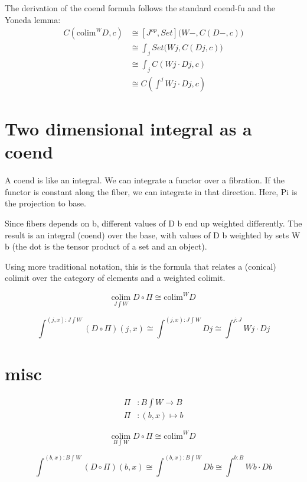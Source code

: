 \documentclass[11pt]{amsart}
\begin{document}
The derivation of the coend formula follows the standard coend-fu and the Yoneda lemma:
\begin{align*}
C(\mbox{colim}^W D, c) & \cong [J^{op}, Set]\big(W-, C(D -, c)\big) \\
 &\cong \int_j Set \big(W j, C(D j, c)\big) \\
 &\cong \int_j C(W j \cdot D j, c) \\
 &\cong C(\int^j W j \cdot D j, c)
\end{align*}

\section{Two dimensional integral as a coend}


A coend is like an integral. We can integrate a functor over a fibration. If the functor is constant along the fiber, we can integrate in that direction. Here, Pi is the projection to base.

Since fibers depends on b, different values of D b end up weighted differently. The result is an integral (coend) over the base, with values of D b weighted by sets W b (the dot is the tensor product of a set and an object).

Using more traditional notation, this is the formula that relates a (conical) colimit over the category of elements and a weighted colimit.

\[\underset{J \int W}{\mbox{colim}} \; D \circ \Pi  \cong \mbox{colim}^W D\]

\[\int^{(j, x) \colon J\int W} (D \circ \Pi) (j, x) \cong \int^{(j, x) \colon J\int W} D j  \cong   \int^{j \colon J} W j \cdot D j\]

\section{misc}

\begin{align*}
\Pi &\colon B \int W  \to B \\
\Pi &\colon (b, x) \mapsto b
\end{align*}

\[\underset{B \int W}{\mbox{colim}} \; D \circ \Pi  \cong \mbox{colim}^W D\]

\[\int^{(b, x) \colon B\int W} (D \circ \Pi) (b, x) \cong \int^{(b, x) \colon B\int W} D b  \cong   \int^{b \colon B} W b \cdot D b\]
\end{document}
